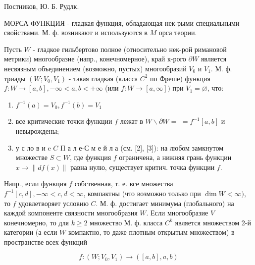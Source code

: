 \documentclass[10pt]{article}
\begin{document}
Постников, Ю. Б. Рудлк.



МОРСА ФУНКЦИЯ - гладкая функция, обладающая нек-рыми специальными свойствами. М. ф. возникают и используются в $M$ орса теории.



Пусть $W$ - гладкое гильбертово полное (относительно нек-рой римановой метрики) многообразие (напр., конечномерное), край к-рого $\partial W$ является несвязным объединением (возможно, пустых) многообразий $V_{0}$ и $V_{1}$. М. ф. триады $\left(W ; V_{0}, V_{1}\right)$ - такая гладкая (класса $C^{2}$ по Фреше) функция $f: W \rightarrow[a, b],-\infty<a, b<+\infty$ (или $f: W \rightarrow[a, \infty])$ при $V_{1}=\varnothing$, что:



\begin{enumerate}

  \item $f^{-1}(a)=V_{0}, f^{-1}(b)=V_{1}$



  \item все критические точки функции $f$ лежат в $W \backslash \partial W=$ $=f^{-1}[a, b]$ и невырождены;



  \item у с ло в и e $C$ П а л е-С м е й л а (см. [2], [3]): на любом замкнутом множестве $S \subset W$, где функция $f$ ограничена, а нижняя грань функции $x \rightarrow\|d f(x)\|$ равна нулю, существует критич. точка функции $f$.



\end{enumerate}



Напр., если функция $f$ собственная, т. е. все множества $f^{-1}[c, d],-\infty<c, d<\infty$, компактны (что возможно только при $\operatorname{dim} W<\infty)$, то $f$ удовлетворяет условию $C$. М. ф. достигает минимума (глобального) на каждой компоненте связности многообразия $W$. Если многообразие $V$ конечномерно, то для $k \geqslant 2$ множество М. ф. класса $C^{k}$ является множеством 2-й категории (а если $W$ компактно, то даже плотным открытым множеством) в пространстве всех функций



\[

f:\left(W ; V_{0}, V_{1}\right) \rightarrow([a, b], a, b)

\]
\end{document}
